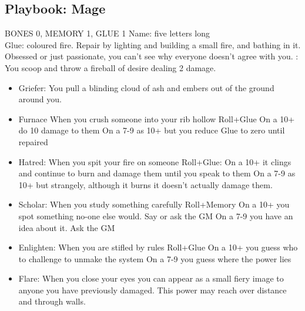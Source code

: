 \subsection{Playbook: Mage}
BONES 0, MEMORY 1, GLUE 1  
Name: five letters long
\\Glue: coloured fire. Repair by lighting and building a small fire, and bathing in it.
Obsessed or just passionate, you can't see why everyone doesn't agree with you.
: You scoop and throw a fireball of desire dealing 2 damage.
\begin{itemize}
\item  Griefer: You pull a blinding cloud of ash and embers out of the ground around you.
\item  Furnace When you crush someone into your rib hollow Roll+Glue
\myitem On a 10+ do 10 damage to them
\myitemend On a 7-9 as 10+ but you reduce Glue to zero until repaired
\item  Hatred: When you spit your fire on someone Roll+Glue:
\myitem On a 10+ it clings and continue to burn and damage them until you speak to them
\myitemend On a 7-9 as 10+ but strangely, although it burns it doesn't actually damage them.
\item  Scholar: When you study something carefully Roll+Memory
\myitem On a 10+ you spot something no-one else would. Say or ask the GM
\myitemend On a  7-9 you have an idea about it. Ask the GM
\item  Enlighten: When you are stifled by rules Roll+Glue
\myitem On a 10+ you guess who to challenge to unmake the system
\myitemend On a 7-9 you guess where the power lies
\item  Flare: When you close your eyes you can appear as a small fiery image to anyone you have previously damaged. This power may reach over distance and through walls.
\end{itemize}

\newpage
